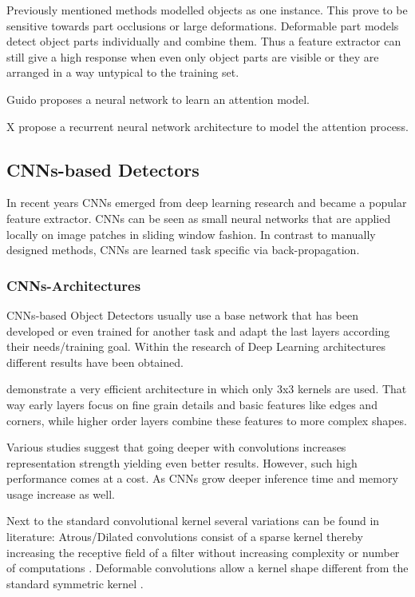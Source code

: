 	Previously mentioned methods modelled objects as one instance. This prove to be sensitive towards part occlusions or large deformations. Deformable part models detect object parts individually and combine them. Thus a feature extractor can still give a high response when even only object parts are visible or they are arranged in a way untypical to the training set.
	
	Guido proposes a neural network to learn an attention model.
	
	X propose a recurrent neural network architecture to model the attention process.
	
	\subsection{\acp{CNN}-based Detectors}
	
	In recent years \acp{CNN} emerged from deep learning research and became a popular feature extractor. \acp{CNN} can be seen as small neural networks that are applied locally on image patches in sliding window fashion. In contrast to manually designed methods, \acp{CNN} are learned task specific via back-propagation.
	
	
	\subsubsection{\acp{CNN}-Architectures}
	
	\acp{CNN}-based Object Detectors usually use a base network that has been developed or even trained for another task and adapt the last layers according their needs/training goal. Within the research of Deep Learning architectures different results have been obtained.
	
	 demonstrate a very efficient architecture in which only 3x3 kernels are used. That way early layers focus on fine grain details and basic features like edges and corners, while higher order layers combine these features to more complex shapes. 
	
	Various studies suggest that going deeper with convolutions increases representation strength yielding even better results. However, such high performance comes at a cost. As \acp{CNN} grow deeper inference time and memory usage increase as well.
	
	Next to the standard convolutional kernel several variations can be found in literature: Atrous/Dilated convolutions consist of a sparse kernel thereby increasing the receptive field of a filter without increasing complexity or number of computations . Deformable convolutions allow a kernel shape different from the standard symmetric kernel .
	

